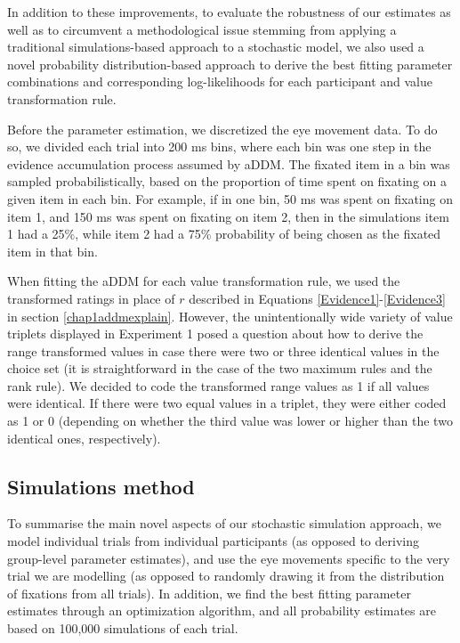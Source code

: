 \documentclass[11pt,a4paper]{article}
\begin{document}
In addition to these improvements, to evaluate the robustness of our estimates as well as to circumvent a methodological issue stemming from applying a traditional simulations-based approach to a stochastic model, we also used a novel probability distribution-based approach to derive the best fitting parameter combinations and corresponding log-likelihoods for each participant and value transformation rule.

Before the parameter estimation, we discretized the eye movement data. To do so, we divided each trial into 200 ms bins, where each bin was one step in the evidence accumulation process assumed by aDDM. The fixated item in a bin was sampled probabilistically, based on the proportion of time spent on fixating on a given item in each bin. For example, if in one bin, 50 ms was spent on fixating on item 1, and 150 ms was spent on fixating on item 2, then in the simulations item 1 had a 25\%, while item 2 had a 75\% probability of being chosen as the fixated item in that bin. 

When fitting the aDDM for each value transformation rule, we used the transformed ratings in place of $r$ described in Equations \ref{Evidence1}-\ref{Evidence3} in section \ref{chap1addmexplain}. However, the unintentionally wide variety of value triplets displayed in Experiment 1 posed a question about how to derive the range transformed values in case there were two or three identical values in the choice set (it is straightforward in the case of the two maximum rules and the rank rule). We decided to code the transformed range values as 1 if all values were identical. If there were two equal values in a triplet, they were either coded as 1 or 0 (depending on whether the third value was lower or higher than the two identical ones, respectively). 


\subsection{Simulations method}

To summarise the main novel aspects of our stochastic simulation approach, we model individual trials from individual participants (as opposed to deriving group-level parameter estimates), and use the eye movements specific to the very trial we are modelling (as opposed to randomly drawing it from the distribution of fixations from all trials). In addition, we find the best fitting parameter estimates through an optimization algorithm, and all probability estimates are based on 100,000 simulations of each trial.
\end{document}

